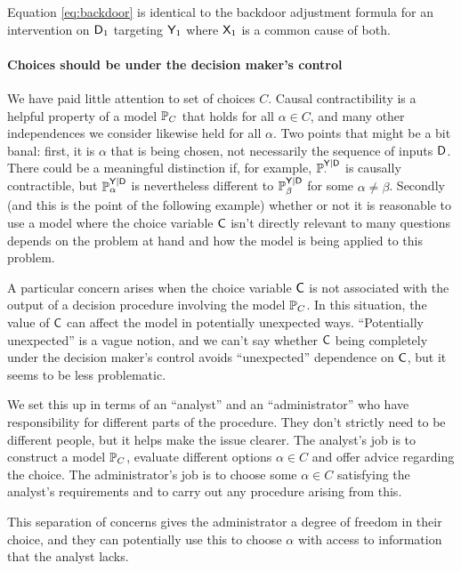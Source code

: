 Equation \ref{eq:backdoor} is identical to the backdoor adjustment formula \citep[Chap. 1]{pearl_causality:_2009} for an intervention on $\mathsf{D}_1$ targeting $\mathsf{Y}_1$ where $\mathsf{X}_1$ is a common cause of both.

\paragraph{Choices should be under the decision maker's control}

We have paid little attention to set of choices $C$. Causal contractibility is a helpful property of a model $\mathbb{P}_C$ that holds for all $\alpha\in C$, and many other independences we consider likewise held for all $\alpha$. Two points that might be a bit banal: first, it is $\alpha$ that is being chosen, not necessarily the sequence of inputs $\mathsf{D}$. There could be a meaningful distinction if, for example, $\mathbb{P}_\cdot^{\mathsf{Y}|\mathsf{D}}$ is causally contractible, but $\mathbb{P}_\alpha^{\mathsf{Y}|\mathsf{D}}$ is nevertheless different to $\mathbb{P}_\beta^{\mathsf{Y}|\mathsf{D}}$ for some $\alpha\neq\beta$. Secondly (and this is the point of the following example) whether or not it is reasonable to use a model where the choice variable $\mathsf{C}$ isn't directly relevant to many questions depends on the problem at hand and how the model is being applied to this problem. 

A particular concern arises when the choice variable $\mathsf{C}$ is not associated with the output of a decision procedure involving the model $\mathbb{P}_C$. In this situation, the value of $\mathsf{C}$ can affect the model in potentially unexpected ways. ``Potentially unexpected'' is a vague notion, and we can't say whether $\mathsf{C}$ being completely under the decision maker's control avoids ``unexpected'' dependence on $\mathsf{C}$, but it seems to be less problematic.

We set this up in terms of an ``analyst'' and an ``administrator'' who have responsibility for different parts of the procedure. They don't strictly need to be different people, but it helps make the issue clearer. The analyst's job is to construct a model $\mathbb{P}_C$, evaluate different options $\alpha\in C$ and offer advice regarding the choice. The administrator's job is to choose some $\alpha\in C$ satisfying the analyst's requirements and to carry out any procedure arising from this.

This separation of concerns gives the administrator a degree of freedom in their choice, and they can potentially use this to choose $\alpha$ with access to information that the analyst lacks.


